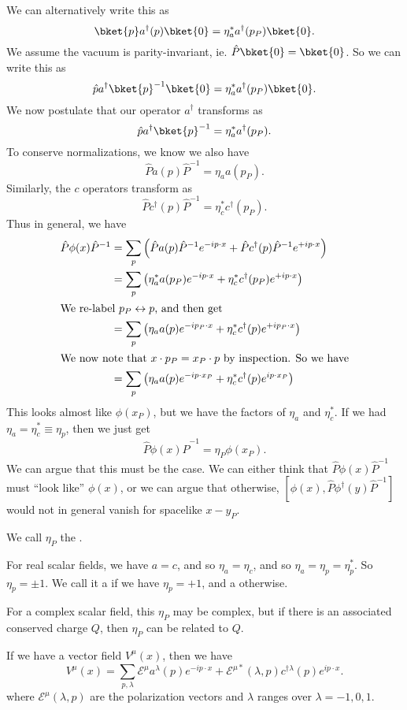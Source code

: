 \documentclass[a4paper]{article}
\begin{document}
We can alternatively write this as
\[
  \bket{p}a^\dagger(p) \bket{0} = \eta_a^* a^\dagger(p_P)\bket{0}.
\]
We assume the vacuum is parity-invariant, ie. $\hat{P}\bket{0} = \bket{0}$. So we can write this as
\[
  \hat{p}a^\dagger \bket{p}^{-1}\bket{0} = \eta_a^* a^\dagger(p_P) \bket{0}.
\]
We now postulate that our operator $a^\dagger$ transforms as
\[
  \hat{p}a^\dagger \bket{p}^{-1} = \eta_a^* a^\dagger(p_P).
\]
To conserve normalizations, we know we also have
\[
  \hat{P} a(p) \hat{P}^{-1} = \eta_a a(p_P).
\]
Similarly, the $c$ operators transform as
\[
  \hat{P} c^\dagger(p) \hat{P}^{-1} = \eta_c^* c^\dagger(p_P).
\]
Thus in general, we have
\begin{align*}
  \hat{P} \phi(x) \hat{P}^{-1} &= \sum_p \left(\hat{P}a(p)\hat{P}^{-1} e^{-ip\cdot x} + \hat{P}c^\dagger (p)\hat{P}^{-1} e^{+ip\cdot x}\right)\\
  &= \sum_p \left(\eta_a^* a(p_P) e^{-ip\cdot x} + \eta_c^* c^\dagger (p_P) e^{+ip\cdot x}\right)\\
  \intertext{We re-label $p_P \leftrightarrow p$, and then get}
  &= \sum_p \left(\eta_a a(p) e^{-i p_P \cdot x} + \eta_c^* c^\dagger(p) e^{+ip_P \cdot x}\right)\\
  \intertext{We now note that $x \cdot p_P = x_P \cdot p$ by inspection. So we have}
  &= \sum_p\left(\eta_a a(p) e^{-ip\cdot x_P} + \eta_c^* c^\dagger(p) e^{ip\cdot x_P}\right)
\end{align*}
This looks almost like $\phi(x_P)$, but we have the factors of $\eta_a$ and $\eta_c^*$. If we had $\eta_a = \eta_c^* \equiv \eta_p$, then we just get
\[
  \hat{P} \phi(x) \hat{P}^{-1} = \eta_P \phi(x_P).
\]
We can argue that this must be the case. We can either think that $\hat{P} \phi(x)\hat{P}^{-1}$ must ``look like'' $\phi(x)$, or we can argue that otherwise, $[\phi(x), \hat{P} \phi^\dagger(y) \hat{P}^{-1}]$ would not in general vanish for spacelike $x - y_P$.

We call $\eta_P$ the .

For real scalar fields, we have $a = c$, and so $\eta_a = \eta_c$, and so $\eta_a = \eta_p = \eta_p^*$. So $\eta_p = \pm 1$. We call it a  if we have $\eta_p = +1$, and a  otherwise.

For a complex scalar field, this $\eta_P$ may be complex, but if there is an associated conserved charge $Q$, then $\eta_P$ can be related to $Q$.

\separator 

If we have a vector field $V^\mu (x)$, then we have
\[
  V^\mu(x) = \sum_{p, \lambda} \mathcal{E}^\mu a^\lambda(p) e^{-ip\cdot x} + \mathcal{E}^{\mu *} (\lambda, p) c^{\dagger \lambda} (p) e^{ip\cdot x}.
\]
where $\mathcal{E}^\mu(\lambda, p)$ are the polarization vectors and $\lambda$ ranges over $\lambda = -1, 0, 1$.
\end{document}
